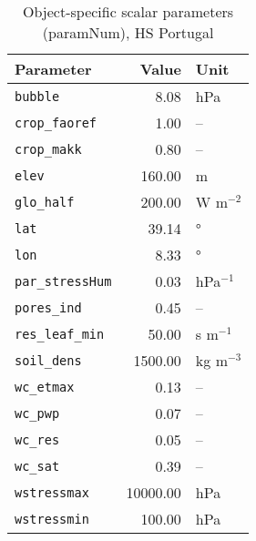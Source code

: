 \begin{table}[ht]
\centering
\caption{Object-specific scalar parameters (\textsf{paramNum}), HS Portugal} 
\label{tab:portugalHS_paramNum}
\begin{tabular}{lrl}
  \hline
Parameter & Value & Unit \\ 
  \hline
\verb!bubble! & 8.08 & hPa \\ 
  \verb!crop_faoref! & 1.00 & -- \\ 
  \verb!crop_makk! & 0.80 & -- \\ 
  \verb!elev! & 160.00 & m \\ 
  \verb!glo_half! & 200.00 & W m$^{-2}$ \\ 
  \verb!lat! & 39.14 & ° \\ 
  \verb!lon! & 8.33 & ° \\ 
  \verb!par_stressHum! & 0.03 & hPa$^{-1}$ \\ 
  \verb!pores_ind! & 0.45 & -- \\ 
  \verb!res_leaf_min! & 50.00 & s m$^{-1}$ \\ 
  \verb!soil_dens! & 1500.00 & kg m$^{-3}$ \\ 
  \verb!wc_etmax! & 0.13 & -- \\ 
  \verb!wc_pwp! & 0.07 & -- \\ 
  \verb!wc_res! & 0.05 & -- \\ 
  \verb!wc_sat! & 0.39 & -- \\ 
  \verb!wstressmax! & 10000.00 & hPa \\ 
  \verb!wstressmin! & 100.00 & hPa \\ 
   \hline
\end{tabular}
\end{table}
